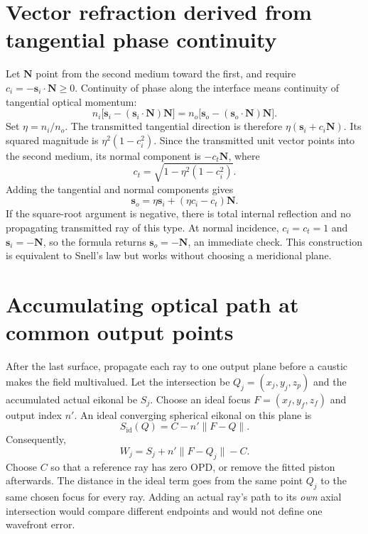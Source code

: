 \section{Vector refraction derived from tangential phase continuity}
Let $\bm N$ point from the second medium toward the first, and require
$c_i=-\bm s_i\cdot\bm N\geq0$. Continuity of phase along the
interface means continuity of tangential optical momentum:
\begin{equation}
 n_i\bigl[\bm s_i-(\bm s_i\cdot\bm N)\bm N\bigr]
 =n_o\bigl[\bm s_o-(\bm s_o\cdot\bm N)\bm N\bigr].
\end{equation}
Set $\eta=n_i/n_o$. The transmitted tangential direction is therefore
$\eta(\bm s_i+c_i\bm N)$. Its squared magnitude is
$\eta^2(1-c_i^2)$. Since the transmitted unit vector points into the
second medium, its normal component is
$-c_t\bm N$, where
\begin{equation}
 c_t=\sqrt{1-\eta^2(1-c_i^2)}.
\end{equation}
Adding the tangential and normal components gives
\begin{equation}
 \boxed{\bm s_o=\eta\bm s_i+(\eta c_i-c_t)\bm N.}
 \label{zc:vectorsnell}
\end{equation}
If the square-root argument is negative, there is total internal
reflection and no propagating transmitted ray of this type. At normal
incidence, $c_i=c_t=1$ and $\bm s_i=-\bm N$, so the formula returns
$\bm s_o=-\bm N$, an immediate check. This construction is equivalent
to Snell's law but works without choosing a meridional plane.

\section{Accumulating optical path at common output points}
After the last surface, propagate each ray to one output plane before
a caustic makes the field multivalued. Let the intersection be
$Q_j=(x_j,y_j,z_p)$ and the accumulated actual eikonal be $S_j$.
Choose an ideal focus $F=(x_f,y_f,z_f)$ and output index $n'$. An ideal
converging spherical eikonal on this plane is
\begin{equation}
 S_{\mathrm{id}}(Q)=C-n'\lVert F-Q\rVert.
\end{equation}
Consequently,
\begin{equation}
 \boxed{W_j=S_j+n'\lVert F-Q_j\rVert-C.}
 \label{zc:raytraceopd}
\end{equation}
Choose $C$ so that a reference ray has zero OPD, or remove the fitted
piston afterwards. The distance in the ideal term goes from the same
point $Q_j$ to the same chosen focus for every ray. Adding an actual
ray's path to its \emph{own} axial intersection would compare different
endpoints and would not define one wavefront error.

